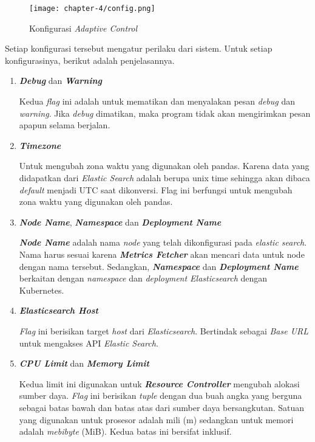 \begin{figure}[h]
    \centering
    \texttt{[image: chapter-4/config.png]}
    \caption{Konfigurasi \textit{Adaptive Control}}
    \label{fig:config-spek}
\end{figure}

Setiap konfigurasi tersebut mengatur perilaku dari sistem. Untuk setiap konfigurasinya, berikut adalah penjelasannya.

\begin{enumerate}
    \item \textbf{\textit{Debug}} dan \textbf{\textit{Warning}}
    
    Kedua \textit{flag} ini adalah untuk mematikan dan menyalakan pesan \textit{debug} dan \textit{warning}. Jika \textit{debug} dimatikan, maka program tidak akan mengirimkan pesan apapun selama berjalan.

    \item \textbf{\textit{Timezone}}
    
    Untuk mengubah zona waktu yang digunakan oleh pandas. Karena data yang didapatkan dari \textit{Elastic Search} adalah berupa unix time sehingga akan dibaca \textit{default} menjadi UTC saat dikonversi. Flag ini berfungsi untuk mengubah zona waktu yang digunakan oleh pandas.

    \item \textbf{\textit{Node Name}}, \textbf{\textit{Namespace}} dan \textbf{\textit{Deployment Name}}
    
    \textbf{\textit{Node Name}} adalah nama \textit{node} yang telah dikonfigurasi pada \textit{elastic search}. Nama harus sesuai karena \textbf{\textit{Metrics Fetcher}} akan mencari data untuk node dengan nama tersebut. Sedangkan, \textbf{\textit{Namespace}} dan \textbf{\textit{Deployment Name}} berkaitan dengan \textit{namespace} dan \textit{deployment Elasticsearch} dengan Kubernetes.

    \item \textbf{\textit{Elasticsearch Host}}
    
    \textit{Flag} ini berisikan target \textit{host} dari \textit{Elasticsearch}. Bertindak sebagai \textit{Base URL} untuk mengakses API \textit{Elastic Search}.

    \item \textbf{\textit{CPU Limit}} dan \textbf{\textit{Memory Limit}}
    
    Kedua limit ini digunakan untuk \textbf{\textit{Resource Controller}} mengubah alokasi sumber daya. \textit{Flag} ini berisikan \textit{tuple} dengan dua buah angka yang berguna sebagai batas bawah dan batas atas dari sumber daya bersangkutan. Satuan yang digunakan untuk prosesor adalah mili (m) sedangkan untuk memori adalah \textit{mebibyte} (MiB). Kedua batas ini bersifat inklusif.


\end{enumerate}
